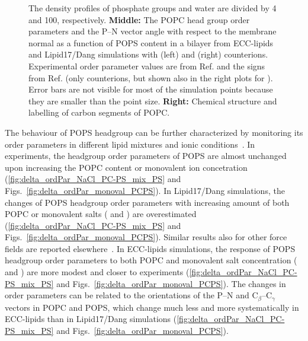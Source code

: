 \documentclass[journal=jpcbfk,manuscript=article]{achemso}
\begin{document}
\begin{figure}[!tbp]
{    The density profiles of phosphate groups and water are divided by 4 and 100, respectively.  
    \textbf{Middle:} The POPC head group order parameters and the P--N vector angle
    with respect to the membrane normal as a function of POPS content in a bilayer
    from ECC-lipids and Lipid17/Dang simulations with  (left) and  (right) counterions.
    Experimental order parameter values are from Ref. 
    and the signs from Ref.  
    (only  counterions, but shown also in the right plots for ).
    Error bars are not visible for most of the simulation points because they are smaller than the point size.
    \textbf{Right:} Chemical structure and labelling of carbon segments of POPC. 
  }
 \\
\end{figure} 

The behaviour of POPS headgroup can be further characterized by monitoring its order parameters in different
lipid mixtures and ionic conditions~\cite{NMRlipidsIV,roux90}.
In experiments, the headgroup order parameters of POPS are almost unchanged upon increasing the POPC content or monovalent ion concetration
(\ref{fig:delta_ordPar_NaCl_PC-PS_mix_PS} and Figs.~\ref{fig:delta_ordPar_monoval_PCPS}).
In Lipid17/Dang simulations, the changes of POPS headgroup order parameters with increasing amount of
both POPC or monovalent salts ( and ) are overestimated (\ref{fig:delta_ordPar_NaCl_PC-PS_mix_PS} and Figs.~\ref{fig:delta_ordPar_monoval_PCPS}).
Similar results also for other force fields are reported elsewhere~\cite{NMRlipidsIV}.
In ECC-lipids simulations, the response of POPS headgroup order parameters to both POPC and monovalent salt concentration ( and )
are more modest and closer to experiments (\ref{fig:delta_ordPar_NaCl_PC-PS_mix_PS} and Figs.~\ref{fig:delta_ordPar_monoval_PCPS}).
The changes in order parameters can be related to the orientations of the P--N and C$_{\beta}$--C$_{\gamma}$
vectors in POPC and POPS, which change much less and more systematically in ECC-lipids
than in Lipid17/Dang simulations (\ref{fig:delta_ordPar_NaCl_PC-PS_mix_PS} and Figs.~\ref{fig:delta_ordPar_monoval_PCPS}). 
\end{document}
